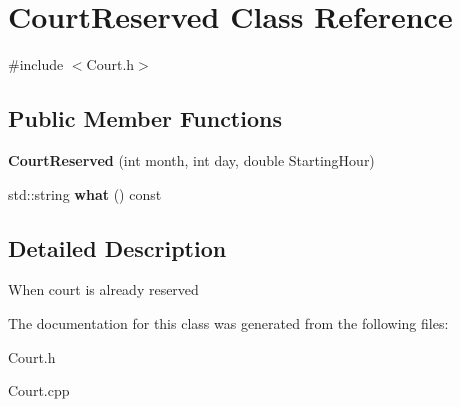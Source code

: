 \hypertarget{class_court_reserved}{}\section{Court\+Reserved Class Reference}
\label{class_court_reserved}


{\ttfamily \#include $<$Court.\+h$>$}

\subsection*{Public Member Functions}
\begin{DoxyCompactItemize}
\item 
\mbox{\label{class_court_reserved_a841e91cf714463cf47a20be9b8d32752}} 
{\bfseries Court\+Reserved} (int month, int day, double Starting\+Hour)
\item 
\mbox{\label{class_court_reserved_a3f86a29ee125b95d68c4ee9ea6163e4e}} 
std\+::string {\bfseries what} () const
\end{DoxyCompactItemize}


\subsection{Detailed Description}
When court is already reserved 

The documentation for this class was generated from the following files\+:\begin{DoxyCompactItemize}
\item 
Court.\+h\item 
Court.\+cpp\end{DoxyCompactItemize}
